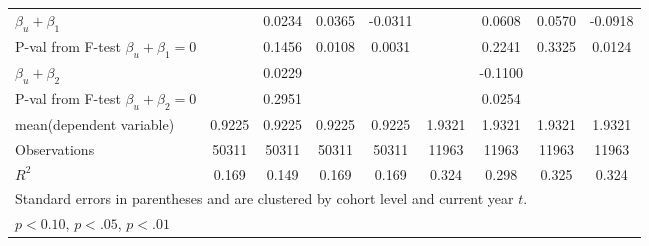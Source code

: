 \begin{table}[htbp]
\begin{adjustbox}{max width=0.95\textwidth}
\begin{tabular}{l*{8}{c}}
\hline
$\beta_u + \beta_1 $    &                &       0.0234         &       0.0365         &       -0.0311         &                &       0.0608         &      0.0570          &        -0.0918        \\
P-val from F-test $\beta_u + \beta_1=0 $   &                &       0.1456         &       0.0108         &       0.0031         &                &         0.2241       &       0.3325         &      0.0124          \\
$\beta_u + \beta_2$    &                &       0.0229         &                             &                             &                 &     -0.1100           &                           &                \\
P-val from F-test $\beta_u + \beta_2=0 $&                &      0.2951         &                             &                            &                &            0.0254    &                &                \\
\hline
mean(dependent variable)            &       0.9225         &       0.9225         &       0.9225         &       0.9225            &     1.9321        &      1.9321  &  1.9321  &  1.9321     \\
\hline
Observations       &       50311         &       50311         &       50311         &       50311         &       11963         &       11963         &       11963         &       11963         \\
\(R^{2}\)   &       0.169         &       0.149         &       0.169         &       0.169         &       0.324         &       0.298         &       0.325         &       0.324         \\
\hline\hline
\multicolumn{9}{l}{\footnotesize Standard errors in parentheses and are clustered by cohort level and current year $t$.}\\
\multicolumn{9}{l}{\footnotesize \sym{*} \(p<0.10\), \sym{**} \(p<.05\), \sym{***} \(p<.01\)}\\
\end{tabular}
	\end{adjustbox}
\end{table}